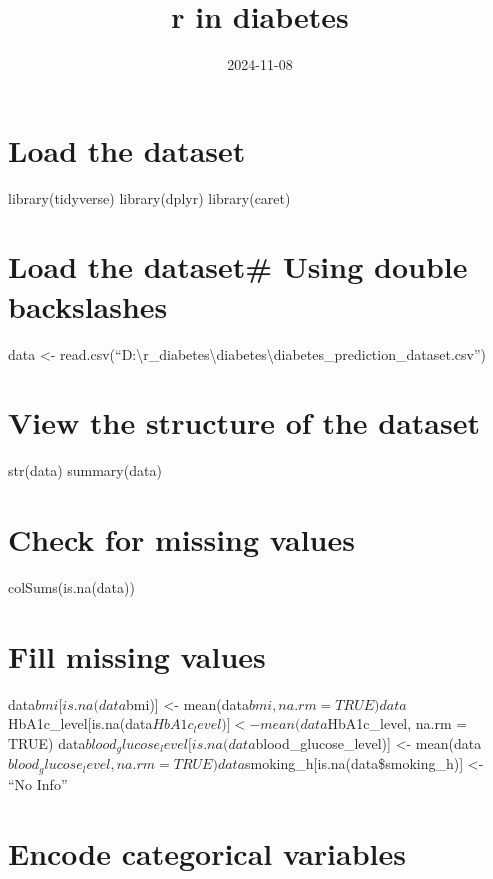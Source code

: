 \documentclass[
]{article}
\title{r in diabetes}
\author{}
\date{\vspace{-2.5em}2024-11-08}
\begin{document}
\maketitle

\hypertarget{load-the-dataset}{%
\section{Load the dataset}\label{load-the-dataset}}

library(tidyverse) library(dplyr) library(caret)

\hypertarget{load-the-dataset-using-double-backslashes}{%
\section{Load the dataset\# Using double
backslashes}\label{load-the-dataset-using-double-backslashes}}

data \textless-
read.csv(``D:\textbackslash r\_diabetes\textbackslash diabetes\textbackslash diabetes\_prediction\_dataset.csv'')

\hypertarget{view-the-structure-of-the-dataset}{%
\section{View the structure of the
dataset}\label{view-the-structure-of-the-dataset}}

str(data) summary(data)

\hypertarget{check-for-missing-values}{%
\section{Check for missing values}\label{check-for-missing-values}}

colSums(is.na(data))

\hypertarget{fill-missing-values}{%
\section{Fill missing values}\label{fill-missing-values}}

data\(bmi[is.na(data\)bmi){]} \textless-
mean(data\(bmi, na.rm = TRUE) data\)HbA1c\_level{[}is.na(data\(HbA1c_level)] <- mean(data\)HbA1c\_level,
na.rm = TRUE)
data\(blood_glucose_level[is.na(data\)blood\_glucose\_level){]}
\textless-
mean(data\(blood_glucose_level, na.rm = TRUE) data\)smoking\_h{[}is.na(data\$smoking\_h){]}
\textless- ``No Info''

\hypertarget{encode-categorical-variables}{%
\section{Encode categorical
variables}\label{encode-categorical-variables}}
\end{document}
